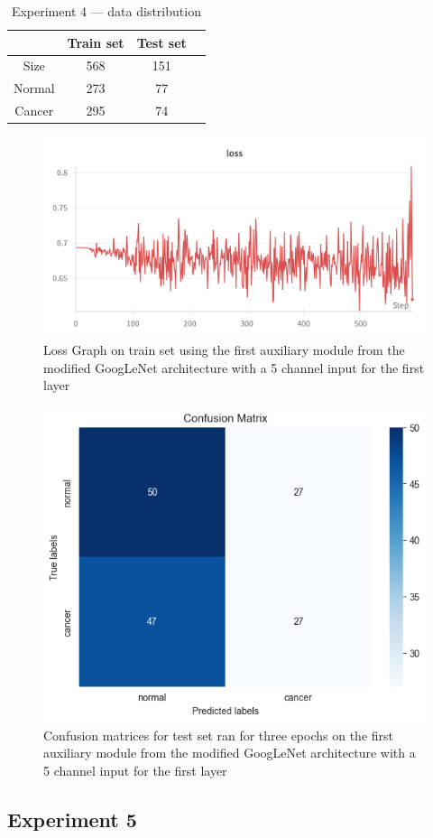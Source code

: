 \begin{table}[ht!]
\centering
\begin{tabular}{|c|c|c|c|}
    \hline
     & Train set & Test set \\ \hline
    Size & 568 & 151 \\ \hline
    Normal & 273 & 77\\ \hline
    Cancer & 295 & 74\\ \hline
    \end{tabular}
    \caption{Experiment 4 --- data distribution}
    \label{tab:tab2}
\end{table}

\begin{figure}[!ht]
    \centering
    \includegraphics[width=0.75\linewidth]{figures/Figure17.png}
    \caption{Loss Graph on train set using the first auxiliary module from the modified GoogLeNet architecture with a 5 channel input for the first layer}
    \label{fig:fig16}
\end{figure}

\begin{figure}[H]
    \centering
    \includegraphics[width=0.5\linewidth]{figures/Figure18.png}
    \caption{Confusion matrices for test set ran for three epochs on the first auxiliary module from the modified GoogLeNet architecture with a 5 channel input for the first layer}
    \label{fig:fig17}
\end{figure}

\subsection{Experiment 5}

